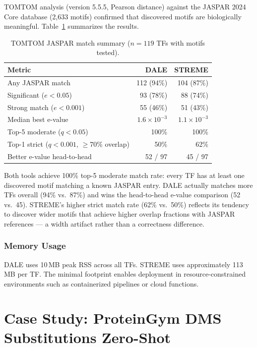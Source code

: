 \documentclass[11pt,a4paper]{article}
\begin{document}
TOMTOM analysis (version 5.5.5, Pearson distance) against the JASPAR 2024 Core database (2{,}633 motifs) confirmed that discovered motifs are biologically meaningful. Table~\ref{tab:tomtom} summarizes the results.

\begin{table}[H]
\centering
\caption{TOMTOM JASPAR match summary ($n = 119$ TFs with motifs tested).}
\label{tab:tomtom}
\small
\begin{tabular}{lrr}
\toprule
Metric & DALE & STREME \\
\midrule
Any JASPAR match            & 112 (94\%) & 104 (87\%) \\
Significant ($e < 0.05$)    & 93 (78\%)  & 88 (74\%) \\
Strong match ($e < 0.001$)  & 55 (46\%)  & 51 (43\%) \\
Median best e-value         & $1.6 \times 10^{-3}$ & $1.1 \times 10^{-3}$ \\
Top-5 moderate ($q < 0.05$) & 100\% & 100\% \\
Top-1 strict ($q < 0.001$, $\geq$70\% overlap) & 50\% & 62\% \\
Better e-value head-to-head & 52 / 97 & 45 / 97 \\
\bottomrule
\end{tabular}
\end{table}

Both tools achieve 100\% top-5 moderate match rate: every TF has at least one discovered motif matching a known JASPAR entry. DALE actually matches more TFs overall (94\% vs.\ 87\%) and wins the head-to-head e-value comparison (52 vs.\ 45). STREME's higher strict match rate (62\% vs.\ 50\%) reflects its tendency to discover wider motifs that achieve higher overlap fractions with JASPAR references — a width artifact rather than a correctness difference.

\subsubsection{Memory Usage}

DALE uses 10\,MB peak RSS across all TFs. STREME uses approximately 113\,MB per TF. The minimal footprint enables deployment in resource-constrained environments such as containerized pipelines or cloud functions.

\section{Case Study: ProteinGym DMS Substitutions Zero-Shot}
\label{sec:casestudy_proteingym}
\end{document}
